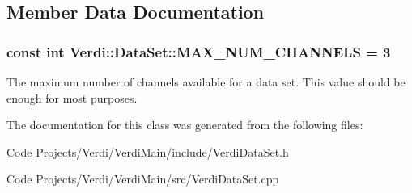 \subsection{\-Member \-Data \-Documentation}
\hypertarget{class_verdi_1_1_data_set_a65d8e95a80ebdfd18ac16fd15101da3c}{
\subsubsection[{\-M\-A\-X\-\_\-\-N\-U\-M\-\_\-\-C\-H\-A\-N\-N\-E\-L\-S}]{\setlength{\rightskip}{0pt plus 5cm}const int {\bf \-Verdi\-::\-Data\-Set\-::\-M\-A\-X\-\_\-\-N\-U\-M\-\_\-\-C\-H\-A\-N\-N\-E\-L\-S} = 3}}\label{class_verdi_1_1_data_set_a65d8e95a80ebdfd18ac16fd15101da3c}
\-The maximum number of channels available for a data set. \-This value should be enough for most purposes. 

\-The documentation for this class was generated from the following files\-:\begin{DoxyCompactItemize}
\item 
\-Code Projects/\-Verdi/\-Verdi\-Main/include/\-Verdi\-Data\-Set.\-h\item 
\-Code Projects/\-Verdi/\-Verdi\-Main/src/\-Verdi\-Data\-Set.\-cpp\end{DoxyCompactItemize}

